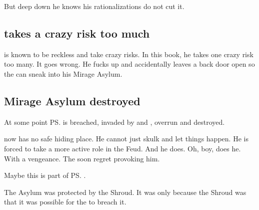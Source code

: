 \begin{garbage}

But deep down he knows his rationalizations do not cut it. 










\subsection{\Ishnaruchaefir{} takes a crazy risk too much}
\QuessanthIshnaruchaefir{} is known to be reckless and take crazy risks. 
In this book, he takes one crazy risk too many. 
It goes wrong. 
He fucks up and accidentally leaves a back door open so the \resphain{} can sneak into his Mirage Asylum. 







\subsection{Mirage Asylum destroyed}
At some point \ps{\Ishnaruchaefir}  is breached, invaded by \resphain{} and \banes, overrun and destroyed. 

\Ishnaruchaefir{} now has no safe hiding place. 
He cannot just skulk and let things happen. 
He is forced to take a more active role in the Feud. 
And he does. 
Oh, boy, does he. 
With a vengeance. 
The \resphain{} soon regret provoking him. 

Maybe this is part of \ps{\Azraid} . 

The Asylum was protected by the Shroud. 
It was only because the Shroud was  that it was possible for the \resphain{} to breach it. 


\end{garbage}
